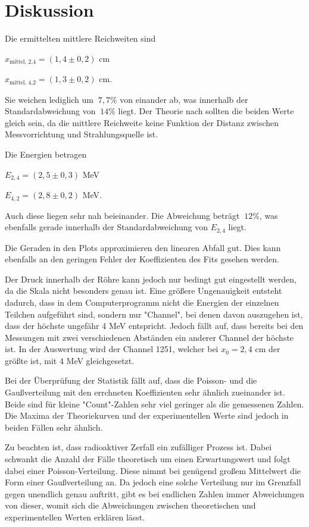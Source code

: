 \section{Diskussion}
\label{sec:Diskussion}

Die ermittelten mittlere Reichweiten sind

\begin{center}
    $x_\text{mittel, 2,4} = (1,4 \pm 0,2)$ cm

    $x_\text{mittel, 4,2} = (1,3 \pm 0,2)$ cm.
\end{center}

Sie weichen lediglich um $~7,7\%$ von einander ab, was innerhalb der Standardabweichung von $~14\%$ liegt.
Der Theorie nach sollten die beiden Werte gleich sein, da die mittlere Reichweite keine Funktion der Distanz zwischen Messvorrichtung und Strahlungsquelle ist.

Die Energien betragen

\begin{center}
    $E_{2,4} = (2,5 \pm 0,3)$ MeV

    $E_{4,2} = (2,8 \pm 0,2)$ MeV.
\end{center}

Auch diese liegen sehr nah beieinander. Die Abweichung beträgt $~12\%$, was ebenfalls gerade innerhalb der Standardabweichung von $E_{2,4}$ liegt.

Die Geraden in den Plots approximieren den linearen Abfall gut. Dies kann ebenfalls an den geringen Fehler der Koeffizienten des Fits gesehen werden.

Der Druck innerhalb der Röhre kann jedoch nur bedingt gut eingestellt werden, da die Skala nicht besonders genau ist.
Eine größere Ungenauigkeit entsteht dadurch, dass in dem Computerprogramm nicht die Energien der einzelnen Teilchen aufgeführt sind, sondern nur "Channel",
bei denen davon auszugehen ist, dass der höchste ungefähr 4 MeV entspricht.
Jedoch fällt auf, dass bereits bei den Messungen mit zwei verschiedenen Abständen ein anderer Channel der höchste ist.
In der Auswertung wird der Channel 1251, welcher bei $x_0 = 2,4$ cm der größte ist, mit 4 MeV gleichgesetzt.

Bei der Überprüfung der Statistik fällt auf, dass die Poisson- und die Gaußverteilung mit den errchneten Koeffizienten sehr ähnlich zueinander ist.
Beide sind für kleine "Count"-Zahlen sehr viel geringer als die gemessenen Zahlen.
Die Maxima der Theoriekurven und der experimentellen Werte sind jedoch in beiden Fällen sehr ähnlich.

Zu beachten ist, dass radioaktiver Zerfall ein zufälliger Prozess ist. Dabei schwankt die Anzahl der Fälle theoretisch um einen Erwartungswert und folgt dabei einer Poisson-Verteilung.
Diese nimmt bei genügend großem Mittelwert die Form einer Gaußverteilung an.
Da jedoch eine solche Verteilung nur im Grenzfall gegen unendlich genau auftritt, gibt es bei endlichen Zahlen immer Abweichungen von dieser,
womit sich die Abweichungen zwischen theoretischen und experimentellen Werten erklären lässt.